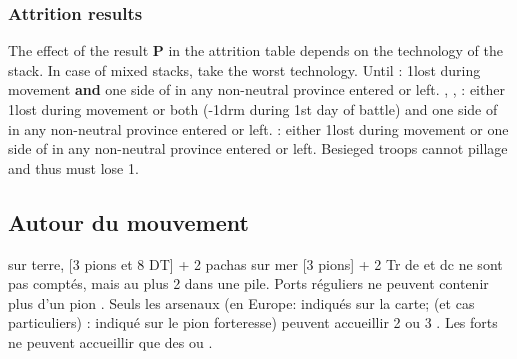\subsubsection{Attrition results}
\aparag The effect of the result \textbf{P} in the attrition table depends on
the technology of the stack. In case of mixed stacks, take the worst technology.
\bparag Until \TARQ: 1\LD lost during movement \textbf{and} one side of
\PILLAGE in any non-neutral province entered or left.
\bparag \TMUS, \TBAR, \TMAN: either 1\LD lost during movement or both
 (-1drm during 1st day of battle) and one side of \PILLAGE in
any non-neutral province entered or left.
\bparag \TL: either 1\LD lost during movement or one side of \PILLAGE in any
non-neutral province entered or left.
\bparag Besieged troops cannot pillage and thus must lose 1\LD.

\subsection{Autour du mouvement}

\aparag[Empilement]
\bparag sur terre, [3 pions et 8 DT] + 2 pachas
\bparag  sur mer [3 pions] + 2 Tr
\bparag de et dc ne sont pas comptés, mais au plus 2 dans une pile.
 Ports réguliers ne peuvent contenir plus d'un pion \FLEET.
Seuls les arsenaux (en Europe: indiqués sur la carte; \ROTW (et cas particuliers) : indiqué
sur le pion forteresse) peuvent accueillir 2 ou 3 \FLEET.
Les forts ne peuvent accueillir que des \DN ou \NDE.

